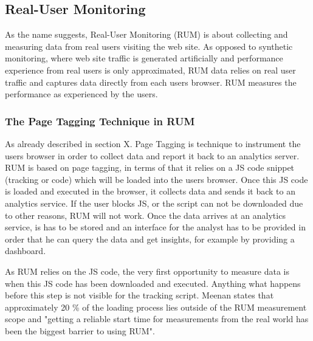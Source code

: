 \subsection{Real-User Monitoring}



As the name suggests, Real-User Monitoring (RUM) is about collecting and measuring data from real users visiting the web site.
As opposed to synthetic monitoring, where web site traffic is generated artificially and performance experience from real users is only approximated, RUM data relies on real user traffic and captures data directly from each users browser. 
RUM measures the performance as experienced by the users. %




\subsubsection{The Page Tagging Technique in RUM}


As already described in section X. Page Tagging is technique to instrument the users browser in order to collect data and report it back to an analytics server.
RUM is based on page tagging, in terms of that it relies on a JS code snippet (tracking or code) which will be loaded into the users browser.
Once this JS code is loaded and executed in the browser, it collects data and sends it back to an analytics service.
If the user blocks JS, or the script can not be downloaded due to other reasons,  RUM will not work.
Once the data arrives at an analytics service, is has to be stored and an interface for the analyst has to be provided in order that he can query the data and get insights, for example by providing a dashboard. %

As RUM relies on the JS code, the very first opportunity to measure data is when this JS code has been downloaded and executed.
Anything what happens before this step is not visible for the tracking script.
Meenan states that approximately 20 \% of the loading process lies outside of the RUM measurement scope and "getting a reliable start time for measurements from the real world has been the biggest barrier to using RUM".%

